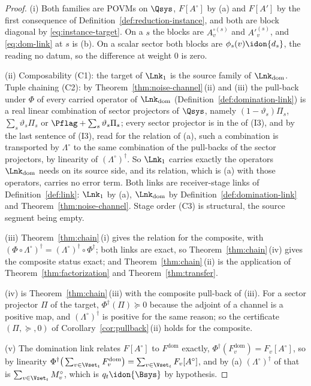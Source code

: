 \begin{proof}
(i) Both families are POVMs on $\Qsys$, $F[A^{\circ}]$ by (a) and $F[A']$ by
the first consequence of Definition~\ref{def:reduction-instance}, and both
are block diagonal by \eqref{eq:instance-target}. On a  $s$ the
blocks are $A^{\circ(s)}_v$ and $A'^{(s)}_v$, and \eqref{eq:dom-link} at $s$ is
(b). On a scalar sector both blocks are $\phi_s(v)\idon{d_s}$, the  reading no datum, so the difference at weight $0$ is zero.

(ii) Composability (C1): the target of $\Lnk_1$ is the source family of
$\Lnk_{\mathrm{dom}}$. Tuple chaining (C2): by
Theorem~\ref{thm:noise-channel}\,(ii) and (iii) the pull-back under $\Phi$ of
every carried operator of $\Lnk_{\mathrm{dom}}$ (Definition~\ref{def:domination-link})
is a real linear combination of sector projectors of $\Qsys$, namely
$(1-\vartheta_s)\Pi_s$, $\sum_s\vartheta_s\Pi_s$ or $\Pflag+\sum_s\vartheta_s\Pi_s$;
every sector projector is in the  of (I3), and by the last
sentence of (I3), read for the relation of (a), such a combination is
transported by $\Lambda^{\circ}$ to the same combination of the pull-backs
of the sector projectors, by linearity of $(\Lambda^{\circ})^{\dagger}$. So
$\Lnk_1$ carries exactly the operators $\Lnk_{\mathrm{dom}}$ needs on its
source side, and its relation, which is (a) with those operators, carries no
error term. Both links are receiver-stage links of
Definition~\ref{def:link}: $\Lnk_1$ by (a), $\Lnk_{\mathrm{dom}}$ by
Definition~\ref{def:domination-link} and Theorem~\ref{thm:noise-channel}.
Stage order (C3) is structural, the source segment being empty.

(iii) Theorem~\ref{thm:chain}\,(i) gives the relation for the composite,
with $(\Phi\circ\Lambda^{\circ})^{\dagger}
=(\Lambda^{\circ})^{\dagger}\circ\Phi^{\dagger}$; both links are exact, so
Theorem~\ref{thm:chain}\,(iv) gives the composite status \textsf{exact}; and
Theorem~\ref{thm:chain}\,(ii) is the application of
Theorem~\ref{thm:factorization} and Theorem~\ref{thm:transfer}.

(iv) is Theorem~\ref{thm:chain}\,(iii) with the composite pull-back of (iii).
For a sector projector $\Pi$ of the target, $\Phi^{\dagger}(\Pi)\succeq0$
because the adjoint of a channel is a positive map, and
$(\Lambda^{\circ})^{\dagger}$ is positive for the same reason; so the
certificate $(\Pi,\succeq,0)$ of Corollary~\ref{cor:pullback}\,(ii) holds for
the composite.

(v) The domination link relates $F[A^{\circ}]$ to $F^{\mathrm{dom}}$ exactly,
$\Phi^{\dagger}(F^{\mathrm{dom}}_v)=F_v[A^{\circ}]$, so by linearity
$\Phi^{\dagger}\big(\sum_{v\in\Vset_t}F^{\mathrm{dom}}_v\big)
=\sum_{v\in\Vset_t}F_v[A^{\circ}]$, and by (a)
$(\Lambda^{\circ})^{\dagger}$ of that is $\sum_{v\in\Vset_t}M^{\circ}_v$,
which is $q_t\idon{\Bsys}$ by hypothesis.
\end{proof}

